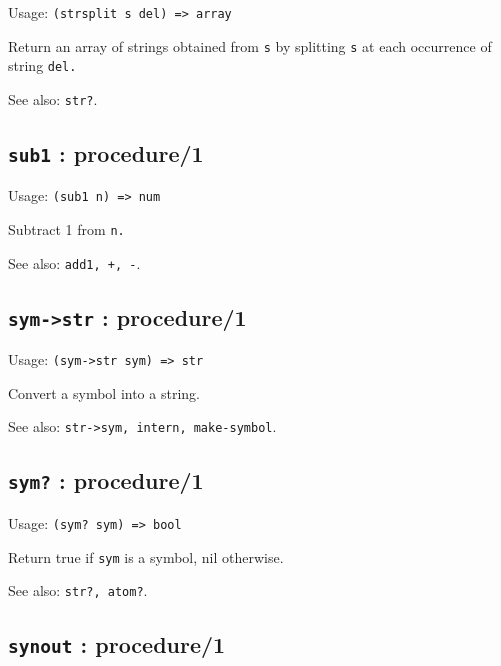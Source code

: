 \documentclass[
]{article}
\newcommand{\passthrough}[1]{#1}
\begin{document}
Usage: \passthrough{\lstinline!(strsplit s del) => array!}

Return an array of strings obtained from \passthrough{\lstinline!s!} by
splitting \passthrough{\lstinline!s!} at each occurrence of string
\passthrough{\lstinline!del.!}

See also: \passthrough{\lstinline!str?!}.

\hypertarget{sub1-procedure1-1}{%
\subsection{\texorpdfstring{\texttt{sub1} :
procedure/1}{sub1 : procedure/1}}\label{sub1-procedure1-1}}

Usage: \passthrough{\lstinline!(sub1 n) => num!}

Subtract 1 from \passthrough{\lstinline!n.!}

See also: \passthrough{\lstinline!add1, +, -!}.

\hypertarget{sym-str-procedure1-1}{%
\subsection{\texorpdfstring{\texttt{sym-\textgreater{}str} :
procedure/1}{sym-\textgreater str : procedure/1}}\label{sym-str-procedure1-1}}

Usage: \passthrough{\lstinline!(sym->str sym) => str!}

Convert a symbol into a string.

See also: \passthrough{\lstinline!str->sym, intern, make-symbol!}.

\hypertarget{sym-procedure1-1}{%
\subsection{\texorpdfstring{\texttt{sym?} :
procedure/1}{sym? : procedure/1}}\label{sym-procedure1-1}}

Usage: \passthrough{\lstinline!(sym? sym) => bool!}

Return true if \passthrough{\lstinline!sym!} is a symbol, nil otherwise.

See also: \passthrough{\lstinline!str?, atom?!}.

\hypertarget{synout-procedure1-1}{%
\subsection{\texorpdfstring{\texttt{synout} :
procedure/1}{synout : procedure/1}}\label{synout-procedure1-1}}
\end{document}
